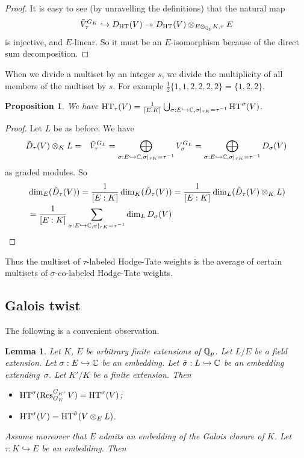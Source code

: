 \documentclass[10pt,a4paper,twoside]{article}
\newtheorem{lem}{Lemma}
\newtheorem{prop}{Proposition}
\begin{document}
\begin{appendix}
\begin{proof}
It is easy to see (by unravelling the definitions) that the natural map
$$
\tilde V_{\tau}^{G_K} \hookrightarrow D_{{\operatorname{HT}}}(V)
\twoheadrightarrow D_{{\operatorname{HT}}}(V)\otimes_{E\otimes_{\mathbb{Q}_p}K, \tau}E
$$
is injective, and $E$-linear.
So it must be an $E$-isomorphism because of the direct sum decomposition.
\end{proof}

When we divide a multiset by an integer $s$, we divide the multiplicity of all members of the multiset by $s$.
For example $\frac{1}{2}\{1,1,2,2,2,2\}=\{1,2,2\}$.


\begin{prop}
\label{prop:lbl-vs-colbl}
We have
${\operatorname{HT}}_{\tau}(V) = \frac{1}{[E:K]}
\bigcup_{\sigma:E\hookrightarrow{\mathbb{C}}, \sigma|_{\tau K}=\tau^{-1}}{\operatorname{HT}}^{\sigma}(V)$.
\end{prop}

\begin{proof}
Let $L$ be as before.
We have 
\begin{eqnarray}
 \tilde D_{\tau}(V)\otimes_KL &=&
\tilde V_{\tau}^{G_L} =
\bigoplus_{\sigma:E\hookrightarrow {\mathbb{C}}, \sigma|_{\tau K} = \tau^{-1}} V_{\sigma}^{G_L} =
\bigoplus_{\sigma:E\hookrightarrow {\mathbb{C}}, \sigma|_{\tau K} = \tau^{-1}} D_{\sigma}(V)\nonumber
\end{eqnarray}
as graded modules.
So
\begin{align*}
&\dim_E(\tilde D_{\tau}(V))
=\frac{1}{[E:K]}\dim_K(\tilde D_{\tau}(V))
=\frac{1}{[E:K]}\dim_L(\tilde D_{\tau}(V)\otimes_KL)
\\&
=\frac{1}{[E:K]}
\sum_{\sigma:E\hookrightarrow {\mathbb{C}}, \sigma|_{\tau K} = \tau^{-1}} \dim_LD_{\sigma}(V)
\end{align*}
\end{proof}

Thus the multiset of $\tau$-labeled Hodge-Tate weights
is the average of certain multisets of $\sigma$-co-labeled Hodge-Tate weights.



\subsection{Galois twist}

The following is a convenient observation.


\begin{lem}
\label{lem:ht-res-ext}
Let $K$, $E$ be arbitrary finite extensions of $\mathbb{Q}_p$.
Let $L/E$ be a field extension.
Let $\sigma: E \hookrightarrow {\mathbb{C}}$ be an embedding.
Let $\tilde \sigma: L\hookrightarrow {\mathbb{C}}$ be an embedding extending~$\sigma$.
Let $K'/K$ be a finite extension.
Then
\begin{itemize}
\item 
[(1)] ${\operatorname{HT}}^{\sigma}(\operatorname{Res}^{G_{K'}}_{G_K}V) = {\operatorname{HT}}^{\sigma}(V)$;
\item
[(2)]
${\operatorname{HT}}^{\sigma}(V) = {\operatorname{HT}}^{\tilde \sigma}(V\otimes_EL)$.
\end{itemize}
Assume moreover that $E$ admits an embedding of the Galois closure of $K$.
Let $\tau:K\hookrightarrow E$ be an embedding.
Then


\end{lem}
\end{appendix}
\end{document}
